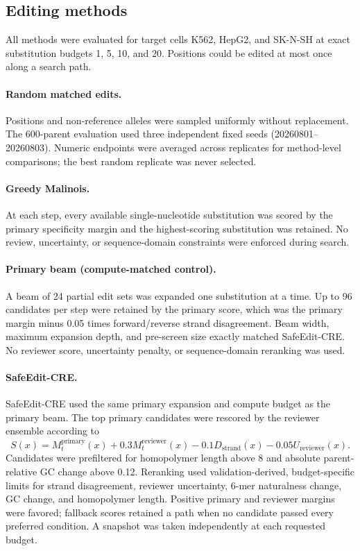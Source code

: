 \subsection{Editing methods}

All methods were evaluated for target cells K562, HepG2, and SK-N-SH at exact
substitution budgets 1, 5, 10, and 20. Positions could be edited at most once along a
search path.

\paragraph{Random matched edits.}
Positions and non-reference alleles were sampled uniformly without replacement.
The 600-parent evaluation used three independent fixed seeds (20260801--20260803).
Numeric endpoints were averaged across replicates for method-level comparisons; the
best random replicate was never selected.

\paragraph{Greedy Malinois.}
At each step, every available single-nucleotide substitution was scored by the primary
specificity margin and the highest-scoring substitution was retained. No review,
uncertainty, or sequence-domain constraints were enforced during search.

\paragraph{Primary beam (compute-matched control).}
A beam of 24 partial edit sets was expanded one substitution at a time. Up to 96
candidates per step were retained by the primary score, which was the primary margin
minus 0.05 times forward/reverse strand disagreement. Beam width, maximum expansion
depth, and pre-screen size exactly matched SafeEdit-CRE. No reviewer score,
uncertainty penalty, or sequence-domain reranking was used.

\paragraph{SafeEdit-CRE.}
SafeEdit-CRE used the same primary expansion and compute budget as the primary beam.
The top primary candidates were rescored by the reviewer ensemble according to
\begin{equation}
S(x)=M_t^{\mathrm{primary}}(x)+0.3M_t^{\mathrm{reviewer}}(x)
-0.1D_{\mathrm{strand}}(x)-0.05U_{\mathrm{reviewer}}(x).
\end{equation}
Candidates were prefiltered for homopolymer length above 8 and absolute parent-relative
GC change above 0.12. Reranking used validation-derived, budget-specific limits for
strand disagreement, reviewer uncertainty, 6-mer naturalness change, GC change, and
homopolymer length. Positive primary and reviewer margins were favored; fallback
scores retained a path when no candidate passed every preferred condition. A snapshot
was taken independently at each requested budget.

